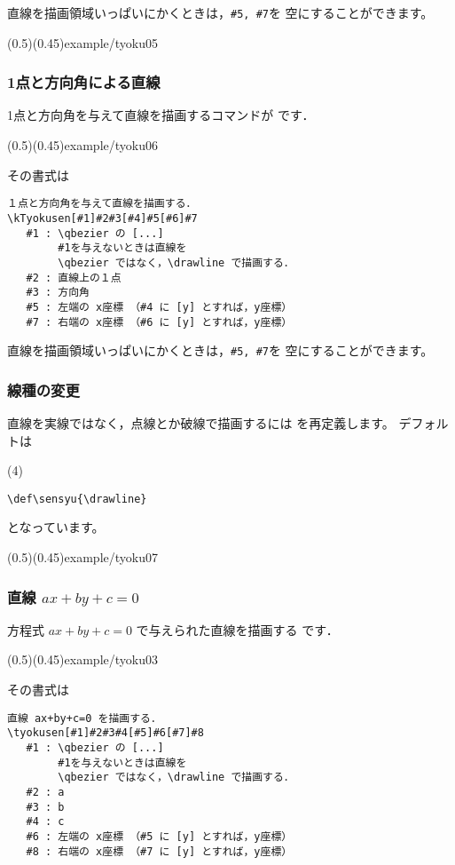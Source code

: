 直線を描画領域いっぱいにかくときは，\verb/#5, #7/を
空にすることができます。

\showexample[端点の指定省略](0.5)(0.45){example/tyoku05}

\subsubsection{1点と方向角による直線}
1点と方向角を与えて直線を描画するコマンドが
 です．

\showexample[1点と方向角を指定](0.5)(0.45){example/tyoku06}

その書式は
\begin{boxnote}
\begin{verbatim}
１点と方向角を与えて直線を描画する．
\kTyokusen[#1]#2#3[#4]#5[#6]#7
   #1 : \qbezier の [...]
        #1を与えないときは直線を
        \qbezier ではなく，\drawline で描画する．
   #2 : 直線上の１点
   #3 : 方向角
   #5 : 左端の x座標 （#4 に [y] とすれば，y座標）
   #7 : 右端の x座標 （#6 に [y] とすれば，y座標）
\end{verbatim}
\end{boxnote}

直線を描画領域いっぱいにかくときは，\verb/#5, #7/を
空にすることができます。

\subsubsection{線種の変更}
直線を実線ではなく，点線とか破線で描画するには を再定義します。
デフォルトは
\begin{jquote}(4\zw)
\begin{verbatim}
\def\sensyu{\drawline}
\end{verbatim}
\end{jquote}
となっています。

\showexample[線種の変更](0.5)(0.45){example/tyoku07}

\subsubsection{直線 \texorpdfstring{%
      \protect $ax+by+c=0$}{ax+by+c=0}}
方程式 $ax+by+c=0$ で与えられた直線を描画する  です．

\showexample[方程式の係数指定](0.5)(0.45){example/tyoku03}

その書式は
\begin{boxnote}
\begin{verbatim}
直線 ax+by+c=0 を描画する．
\tyokusen[#1]#2#3#4[#5]#6[#7]#8
   #1 : \qbezier の [...]
        #1を与えないときは直線を
        \qbezier ではなく，\drawline で描画する．
   #2 : a
   #3 : b
   #4 : c
   #6 : 左端の x座標 （#5 に [y] とすれば，y座標）
   #8 : 右端の x座標 （#7 に [y] とすれば，y座標）
\end{verbatim}
\end{boxnote}

